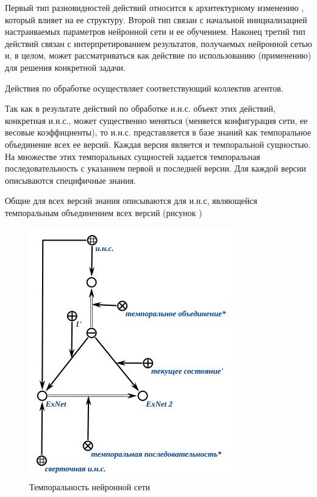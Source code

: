 Первый тип разновидностей действий относится к архитектурному изменению , который влияет на ее структуру. Второй тип связан с начальной инициализацией настраиваемых параметров нейронной сети и ее обучением. Наконец третий тип действий связан с интерпретированием результатов, получаемых нейронной сетью и, в целом, может рассматриваться как действие по использованию (применению)  для решения конкретной задачи.

Действия по обработке  осуществляет соответствующий коллектив агентов. 

Так как в результате действий по обработке и.н.с. объект этих действий, конкретная и.н.с., может существенно меняться (меняется конфигурация сети, ее весовые коэффициенты), то и.н.с. представляется в базе знаний как темпоральное объединение всех ее версий. Каждая версия является   и темпоральной сущностью. На множестве этих темпоральных сущностей задается темпоральная последовательность с указанием первой и последней версии. Для каждой версии описываются специфичные знания.

Общие для всех версий знания описываются для и.н.с, являющейся темпоральным объединением всех версий (рисунок \textit{})

\begin{figure}[H]
	\includegraphics[scale=0.8]{author/part3/figures/temporal_neural_network_scg.png}
	\caption{Темпоральность нейронной сети}
	\label{fig:temporal_neural_network_scg}
\end{figure}

